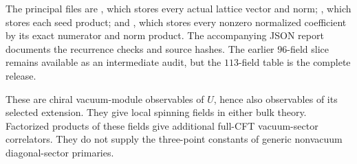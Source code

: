 The principal files are
,
which stores every actual lattice vector and norm;
, which stores each seed product;
and , which stores every
nonzero normalized coefficient by its exact numerator and norm product.
The accompanying JSON report documents the recurrence checks and
source hashes. The earlier $96$-field slice remains available as an
intermediate audit, but the $113$-field table is the complete release.

These are chiral vacuum-module observables of $U$, hence also
observables of its selected extension. They give local spinning fields
in either bulk theory. Factorized products of these fields give
additional full-CFT vacuum-sector correlators. They do not supply the
three-point constants of generic nonvacuum diagonal-sector primaries.
